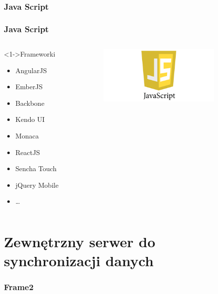 \documentclass{beamer}
\begin{document}
\subsubsection{Java Script}
\begin{frame}
\frametitle{Java Script}
     \begin{columns}[T] %
      
     \begin{column}[T]{6cm} %
    \begin{block}<1->{Frameworki}
			\begin{itemize}
    \item<1-> AngularJS
    \item<2->  EmberJS
    \item<3->  Backbone
    \item<4->  Kendo UI
    \item<5-> Monaca
    \item<6->  ReactJS
    \item<6-> Sencha Touch
    \item<6->  jQuery Mobile
    \item<5-> \dots
\end{itemize}
\end{block}
     \end{column}
     \begin{column}[T]{6cm} %
          \includegraphics[width=6cm]{js.png}
     \end{column}
     \end{columns}
     
     

\end{frame}
\section{Zewnętrzny serwer do synchronizacji danych}
\begin{frame}
\frametitle{Frame2}
\end{frame}
\end{document}
